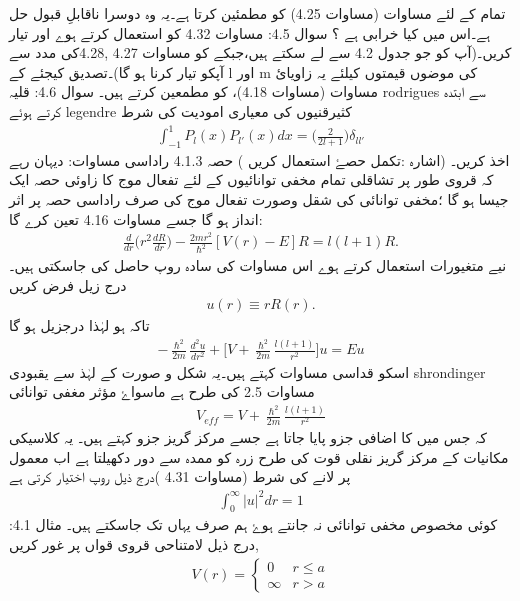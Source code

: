 تمام
کے لئے مساوات
(مساوات 4.25) کو مطمئین کرتا ہے۔یہ وہ دوسرا ناقابلِ قبول حل ہے۔اس میں کیا خرابی ہے ؟
سوال 4.5:
مساوات 4.32 کو استعمال کرتے ہوے
اور
تیار کریں۔(آپ
کو جو جدول 4.2 سے لے سکتے ہیں،جبکے
کو مساوات 4.27 ,4.28کی مدد سے آپکو تیار کرنا ہو گا)۔تصدیق کیجئے کے l اور m کی موضوں قیمتوں کیلئے یہ زاویائ مساوات (مساوات 4.18)، کو  مطمعین کرتے ہیں۔
سوال 4.6:
قلیہ rodrigues سے ابتدہ کرتے ہوئے legendre کثیرقنیوں کی معیاری امودیت کی شرط
\begin{align}
\int_{-1}^{1}P_{l}(x)P_{l'}(x)dx=\big(\frac{2}{2l+1}\big)\delta_{ll'} 
\end{align}
اخذ کریں۔ (اشارہ :تکمل حصۓ استعمال کریں )
حصہ 4.1.3 راداسی مساوات:
دیہان رہے کہ قروی طور پر تشاقلی تمام مخفی توانائیوں کے لئے تفعال موج کا زاوئی حصہ
ایک جیسا ہو گا ؛مخفی توانائی
کی شقل وصورت تفعال موج کی صرف راداسی حصہ
پر اثر انداز ہو گا جسے مساوات 4.16 تعین کرے گا:
\begin{align}
\frac{d}{dr}\big(r^{2}\frac{dR}{dr}\big)-\frac{2mr^{2}}{\hslash^{2}}[V(r)-E]R=l(l+1)R. 
\end{align}
نیے متغیورات استعمال کرتے ہوے اس مساوات کی سادہ روپ حاصل کی جاسکتی ہیں۔ درج زیل فرض کریں
\begin{align}
u(r)\equiv{rR(r).} 
\end{align}  
تاکہ
ہو لہٰذا درجزیل ہو گا
\begin{align}
\boxed{-\frac{\hslash^{2}}{2m}\frac{d^{2}u}{dr^{2}}+\big[V+\frac{\hslash^{2}}{2m}\frac{l(l+1)}{r^{2}}\big]u=Eu} 
\end{align}
اسکو قداسی مساوات کہتے ہیں۔یہ شکل و صورت کے لہٰذ سے یقبودی shrondinger مساوات 2.5 کی طرح ہے ماسواۓ مؤثر مغفی توانائی
\begin{align}
V_{eff}=V+\frac{\hslash^{2}}{2m}\frac{l(l+1)}{r^{2}} 
\end{align}
کہ جس میں
کا اضافی جزو پایا جاتا ہے جسے مرکز گریز جزو کہتے ہیں۔ یہ كلاسیكی مکانیات کے مرکز گریز نقلی قوت کی طرح زرہ کو ممدہ سے دور دکھیلتا ہے اب معمول پر لانے کی شرط (مساوات 4.31 )درج ذیل روپ اختیار کرتی ہے 
\begin{align}
\int_{0}^{\infty}|u|^{2}dr=1 
\end{align}
کوئی مخصوص مخفی توانائی
نہ جانتے ہوۓ ہم صرف یہاں تک جاسکتے ہیں۔
مثال 4.1:
درج ذیل لامتناحی قروی قواں پر غور کریں,
\begin{align}
V(r)=\begin{cases}
0&r\leq{a}\\
\infty&r>a
\end{cases} 
\end{align}
